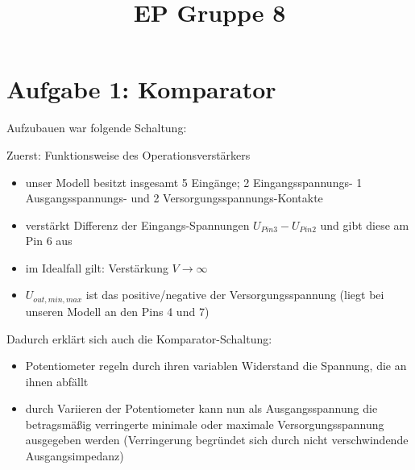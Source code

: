 \documentclass[compress,11pt]{beamer}
\title{EP Gruppe 8}
\begin{document}
\section{Aufgabe 1: Komparator}
\begin{frame}
Aufzubauen war folgende Schaltung:
\end{frame}

\begin{frame}
\begin{block}{Zuerst: Funktionsweise des Operationsverstärkers}
\begin{itemize}
\item unser Modell besitzt insgesamt 5 Eingänge; 2 Eingangsspannungs- 1 Ausgangsspannungs- und 2 Versorgungsspannungs-Kontakte
\item verstärkt Differenz der Eingangs-Spannungen $U_{Pin3} - U_{Pin2}$ und gibt diese am Pin 6 aus
\item im Idealfall gilt: Verstärkung $V \rightarrow \infty$
\item $U_{out,min,max}$ ist das positive/negative der Versorgungsspannung (liegt bei unseren Modell an den Pins 4 und 7)
\end{itemize}

\end{block}
\end{frame}
\begin{frame}
Dadurch erklärt sich auch die Komparator-Schaltung:
\begin{itemize}
\item Potentiometer regeln durch ihren variablen Widerstand die Spannung, die an ihnen abfällt
\item durch Variieren der Potentiometer kann nun als Ausgangsspannung die betragsmäßig verringerte minimale oder maximale Versorgungsspannung ausgegeben werden (Verringerung begründet sich durch nicht verschwindende Ausgangsimpedanz)
\end{itemize}
\end{frame}
\begin{frame}
\end{frame}
\end{document}
